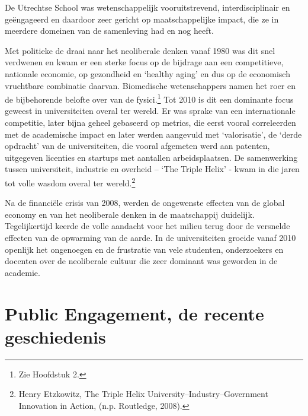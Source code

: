 \documentclass{jote-book}
\begin{document}
	 De Utrechtse School was wetenschappelijk vooruitstrevend, interdisciplinair en geëngageerd en daardoor zeer gericht op maatschappelijke impact, die ze in meerdere domeinen van de samenleving had en nog heeft.



	Met politieke de draai naar het neoliberale denken vanaf 1980 was dit snel verdwenen en kwam er een sterke focus op de bijdrage aan een competitieve, nationale economie, op gezondheid en ‘healthy aging' en dus op de economisch vruchtbare combinatie daarvan. Biomedische wetenschappers namen het roer en de bijbehorende belofte over van de fysici.\footnote{Zie Hoofdstuk 2. } Tot 2010 is dit een dominante focus geweest in universiteiten overal ter wereld. Er was sprake van een internationale competitie, later bijna geheel gebaseerd op metrics, die eerst vooral correleerden met de academische impact en later werden aangevuld met ‘valorisatie', de ‘derde opdracht' van de universiteiten, die vooral afgemeten werd aan patenten, uitgegeven licenties en startups met aantallen arbeidsplaatsen. De samenwerking tussen universiteit, industrie en overheid -- ‘The Triple Helix' - kwam in die jaren tot volle wasdom overal ter wereld.\footnote{Henry Etzkowitz, The Triple Helix University--Industry--Government Innovation in Action, (n.p. Routledge, 2008). }



	Na de financiële crisis van 2008, werden de ongewenste effecten van de global economy en van het neoliberale denken in de maatschappij duidelijk. Tegelijkertijd keerde de volle aandacht voor het milieu terug door de versnelde effecten van de opwarming van de aarde. In de universiteiten groeide vanaf 2010 openlijk het ongenoegen en de frustratie van vele studenten, onderzoekers en docenten over de neoliberale cultuur die zeer dominant was geworden in de academie.



	\section{Public Engagement, de recente geschiedenis}
\end{document}
